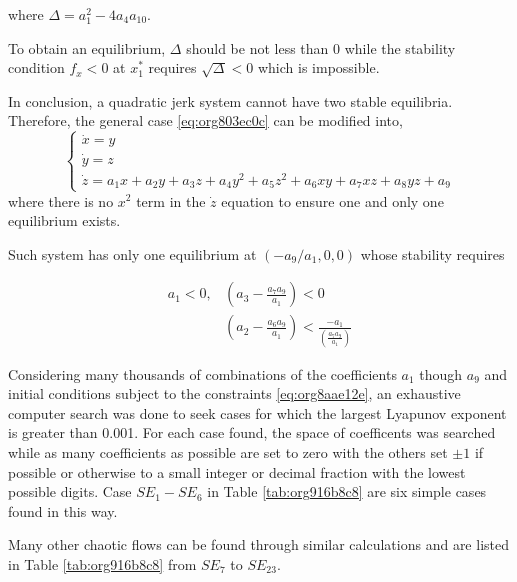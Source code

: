   where \(\Delta = a_1^2 - 4a_4a_{10}\).

  To obtain an equilibrium, \(\Delta\) should be not less than 0 while the stability condition
  \(f_x < 0\) at \(x_1^{*}\) requires \(\sqrt{\Delta} < 0\) which is impossible. 

  In conclusion, a quadratic jerk system cannot have two stable equilibria. Therefore,
  the general case \ref{eq:org803ec0c} can be modified into,
  \begin{equation}
    \left\{
    \begin{array}{l}
    \dot{x} = y\\\nonumber
    \dot{y} = z\\\nonumber
    \dot{z} = a_1x + a_2y + a_3z + a_4y^2 + a_5z^2 + a_6xy + a_7xz + a_8yz + a_9
    \end{array}
    \right.
  \end{equation}
  where there is no \(x^2\) term in the \(\dot{z}\) equation to ensure one and only one equilibrium exists.

  Such system has only one equilibrium at \((-a_9/a_1,0,0)\) whose stability requires

  \begin{eqnarray*}  
    \label{eq:org8aae12e}
    a_1 < 0,& \left( a_3 - \frac{a_7a_9}{a_1} \right) < 0 \\  
  &\left( a_2 - \frac{a_6a_9}{a_1} \right)  <   \frac{-a_1}{\left( \frac{a_7a_9}{a_1} \right)} 
\end{eqnarray*}

  Considering many thousands of combinations of the coefficients \(a_1\) though \(a_9\) and initial conditions
  subject to the constraints \ref{eq:org8aae12e}, an exhaustive computer search was done to seek
  cases for which the largest Lyapunov exponent is greater than 0.001. For each case found, the space of 
  coefficents was searched while as many coefficients as possible are set to zero with the others set \(\pm{}1\)
  if possible or otherwise to a small integer or decimal fraction with the lowest possible digits.
  Case \(SE_1-SE_6\) in Table \ref{tab:org916b8c8} are six simple cases found in this way.

  Many other chaotic flows can be found through similar calculations and are listed in Table \ref{tab:org916b8c8}
  from $SE_7$ to $SE_{23}$.

